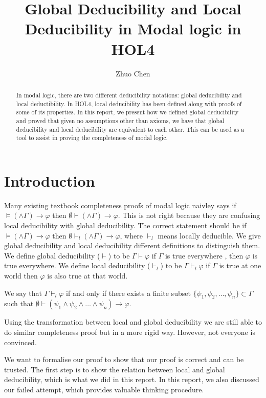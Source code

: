 \documentclass[submission,copyright,creativecommons]{eptcs}
\title{Global Deducibility and Local Deducibility in Modal logic in HOL4}
\author{Zhuo Chen
\institute{
University of Australian National University\\
Canberra, Australia}
\email{zhuo.chen1@anu.edu.au}
}
\begin{document}
\maketitle

\begin{abstract}
In modal logic, there are two different deducibility notations: global deducibility 
and local deductibility. In HOL4, local deducibility has been defined along with proofs 
of some of its properties. In this report, we present how we defined global deducibility
and proved that given no assumptions other than axioms, we have that global deducibility and local deducibility
are equivalent to each other. This can be used as a tool to assist in proving the completeness 
of modal logic. 
\end{abstract}

\section{Introduction}

Many existing textbook completeness proofs of modal logic naivley says if $\models (\wedge \Gamma) \rightarrow \varphi$ 
then $\emptyset \vdash (\wedge \Gamma) \rightarrow \varphi$. 
This is not right because they are confusing local deducibility with 
global deducibility. The correct statement should be if
$\models (\wedge \Gamma) \rightarrow \varphi$ 
then $\emptyset \vdash_l (\wedge \Gamma) \rightarrow \varphi$,
where $\vdash_l$ means locally deducible. 
We give global deducibility and local deducibility different definitions 
to distinguish them.
We define global deducibility ($\vdash$) to be $\Gamma \vdash \varphi$ if $\Gamma$ is true everywhere
, then $\varphi$ is true everywhere.
We define local deducibility ($\vdash_l$) to be $\Gamma \vdash_l \varphi$ 
if $\Gamma$ is true at one world then $\varphi$ is also true at that world.

We say that $\Gamma \vdash_l \varphi$ if and only if there exists a 
finite subset $\{\psi_1, \psi_2,\dots, \psi_n\} \subset \Gamma$ 
such that $\emptyset \vdash (\psi_1 \wedge \psi_2 \wedge \dots \wedge \psi_n) \rightarrow \varphi$.


Using the transformation between local and global deducibility we 
are still able to do similar completeness proof but in a more rigid way. However, not everyone is convinced.

We want to formalise our proof to show that our proof is correct and 
can be trusted. The first step is to show the relation between local and global deducibility,
which is what we did in this report. 
In this report, we also discussed our failed attempt, which provides 
valuable thinking procedure. 
\end{document}
